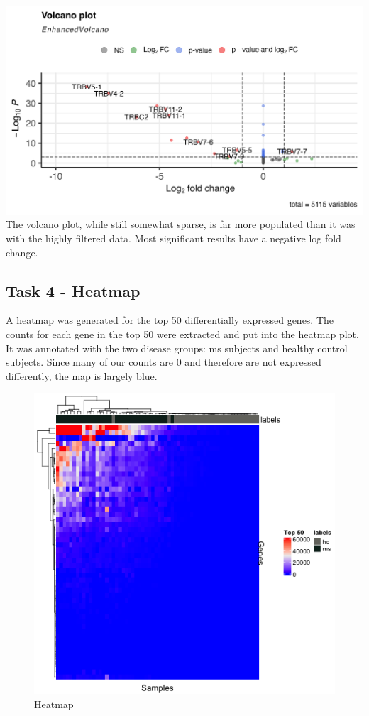 \documentclass[
]{article}
\begin{document}
\includegraphics{../../plots/SRP164913_volcano_plot.png} The volcano
plot, while still somewhat sparse, is far more populated than it was
with the highly filtered data. Most significant results have a negative
log fold change.

\newpage

\subsection{Task 4 - Heatmap}\label{task-4---heatmap}

A heatmap was generated for the top 50 differentially expressed genes.
The counts for each gene in the top 50 were extracted and put into the
heatmap plot. It was annotated with the two disease groups: ms subjects
and healthy control subjects. Since many of our counts are 0 and
therefore are not expressed differently, the map is largely blue.

\begin{figure}
\centering
\includegraphics{../../plots/SRP164913_heatmap_plot.png}
\caption{Heatmap}
\end{figure}
\end{document}
